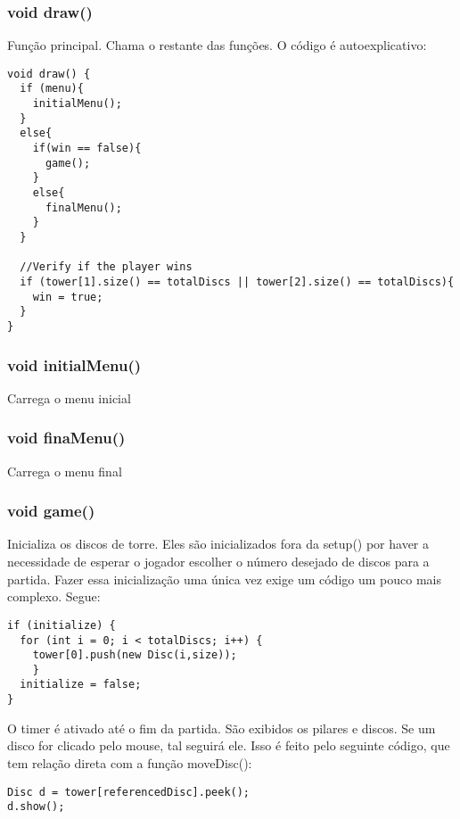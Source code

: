 \documentclass[
	12pt,				%
	oneside,			%
	a4paper,			%
	english,			%
	brazil,				%
	]{abntex2}
\begin{document}
{\subsubsection{void draw()}
Função principal. Chama o restante das funções. O código é autoexplicativo:

\begin{itshape}
\begin{verbatim}
void draw() {
  if (menu){
    initialMenu(); 
  }
  else{
    if(win == false){  
      game();
    }
    else{
      finalMenu();
    }
  }

  //Verify if the player wins
  if (tower[1].size() == totalDiscs || tower[2].size() == totalDiscs){
    win = true;  
  }
}

\end{verbatim}
\end{itshape}
\subsubsection{void initialMenu()}
Carrega o menu inicial
\subsubsection{void finaMenu()}
Carrega o menu final
\subsubsection{void game()}
Inicializa os discos de torre. Eles são inicializados fora da setup() por haver a necessidade de esperar o jogador escolher o número desejado de discos para a partida. Fazer essa inicialização uma única vez exige um código um pouco mais complexo. Segue:

\begin{itshape}
\begin{verbatim}
if (initialize) {
  for (int i = 0; i < totalDiscs; i++) {
    tower[0].push(new Disc(i,size));
    }
  initialize = false;
}
\end{verbatim}
\end{itshape}

O timer é ativado até o fim da partida. São exibidos os pilares e discos. Se um disco for clicado pelo mouse, tal seguirá ele. Isso é feito pelo seguinte código, que tem relação direta com a função moveDisc():

\begin{itshape}
\begin{verbatim}
Disc d = tower[referencedDisc].peek();
d.show();
      

\end{verbatim}
\end{itshape}}
\end{document}
